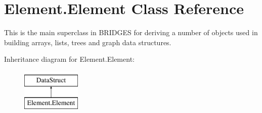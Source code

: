 \hypertarget{class_element_1_1_element}{}\section{Element.\+Element Class Reference}
\label{class_element_1_1_element}


This is the main superclass in B\+R\+I\+D\+G\+ES for deriving a number of objects used in building arrays, lists, trees and graph data structures.  


Inheritance diagram for Element.\+Element\+:\begin{figure}[H]
\begin{center}
\leavevmode
\includegraphics[height=2.000000cm]{class_element_1_1_element}
\end{center}
\end{figure}
